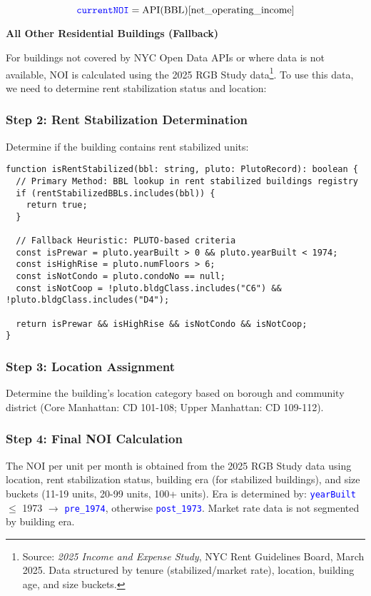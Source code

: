 \documentclass{article}
\newcommand{\code}[1]{\textcolor{blue}{\texttt{#1}}}
\begin{document}
\begin{equation}
\code{currentNOI} = \text{API}(\text{BBL})[\text{net\_operating\_income}]
\end{equation}

\textbf{All Other Residential Buildings (Fallback)}

For buildings not covered by NYC Open Data APIs or where data is not available, NOI is calculated using the 2025 RGB Study data\footnote{Source: \textit{2025 Income and Expense Study}, NYC Rent Guidelines Board, March 2025. Data structured by tenure (stabilized/market rate), location, building age, and size buckets.}. To use this data, we need to determine rent stabilization status and location:

\subsubsection{Step 2: Rent Stabilization Determination}

Determine if the building contains rent stabilized units:

\begin{lstlisting}
function isRentStabilized(bbl: string, pluto: PlutoRecord): boolean {
  // Primary Method: BBL lookup in rent stabilized buildings registry
  if (rentStabilizedBBLs.includes(bbl)) {
    return true;
  }
  
  // Fallback Heuristic: PLUTO-based criteria
  const isPrewar = pluto.yearBuilt > 0 && pluto.yearBuilt < 1974;
  const isHighRise = pluto.numFloors > 6;
  const isNotCondo = pluto.condoNo == null;
  const isNotCoop = !pluto.bldgClass.includes("C6") && !pluto.bldgClass.includes("D4");
  
  return isPrewar && isHighRise && isNotCondo && isNotCoop;
}
\end{lstlisting}

\subsubsection{Step 3: Location Assignment}

Determine the building's location category based on borough and community district (Core Manhattan: CD 101-108; Upper Manhattan: CD 109-112).

\subsubsection{Step 4: Final NOI Calculation}

The NOI per unit per month is obtained from the 2025 RGB Study data using location, rent stabilization status, building era (for stabilized buildings), and size buckets (11-19 units, 20-99 units, 100+ units). Era is determined by: \code{yearBuilt} $\leq$ 1973 $\rightarrow$ \code{pre\_1974}, otherwise \code{post\_1973}. Market rate data is not segmented by building era.
\end{document}
